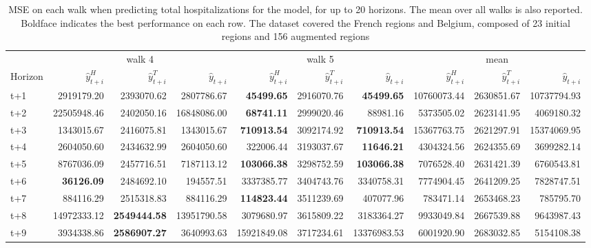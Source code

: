 \begin{table}[H]
\centering
\caption{MSE on each walk when predicting total hospitalizations for the model, for up to 20 horizons. The mean over all walks is also reported. Boldface indicates the best performance on each row. The dataset covered the French regions and Belgium, composed of 23 initial regions and 156 augmented regions }
\label{tab:MSE_walk_assemble}
\begin{tabular}{lrrrrrrrrr}
\toprule
 & \multicolumn{3}{c}{walk 4} & \multicolumn{3}{c}{walk 5} & \multicolumn{3}{c}{mean} 
\\

\cmidrule(lr){2-4} \cmidrule(lr){5-7} \cmidrule(lr){8-10} 
Horizon & $\hat{y}_{t+i}^H$ & $\hat{y}_{t+i}^T$ & $\hat{y}_{t+i}$ & $\hat{y}_{t+i}^H$ & $\hat{y}_{t+i}^T$ & $\hat{y}_{t+i}$ & $\hat{y}_{t+i}^H$ & $\hat{y}_{t+i}^T$ & $\hat{y}_{t+i}$ \\
\midrule
t+1  & 2919179.20  & 2393070.62  & 2807786.67  & \textbf{45499.65}  & 2916070.76  & \textbf{45499.65}  & 10760073.44  & 2630851.67  & 10737794.93  \\
t+2  & 22505948.46  & 2402050.16  & 16848086.00  & \textbf{68741.11}  & 2999020.46  & 88981.16  & 5373505.02  & 2623141.95  & 4069180.32  \\
t+3  & 1343015.67  & 2416075.81  & 1343015.67  & \textbf{710913.54}  & 3092174.92  & \textbf{710913.54}  & 15367763.75  & 2621297.91  & 15374069.95  \\
t+4  & 2604050.60  & 2434632.99  & 2604050.60  & 322006.44  & 3193037.67  & \textbf{11646.21}  & 4304324.56  & 2624355.69  & 3699282.14  \\
t+5  & 8767036.09  & 2457716.51  & 7187113.12  & \textbf{103066.38}  & 3298752.59  & \textbf{103066.38}  & 7076528.40  & 2631421.39  & 6760543.81  \\
t+6  & \textbf{36126.09}  & 2484692.10  & 194557.51  & 3337385.77  & 3404743.76  & 3340758.31  & 7774904.45  & 2641209.25  & 7828747.51  \\
t+7  & 884116.29  & 2515318.83  & 884116.29  & \textbf{114823.44}  & 3511239.69  & 407077.96  & 783471.14  & 2653468.23  & 785795.70  \\
t+8  & 14972333.12  & \textbf{2549444.58}  & 13951790.58  & 3079680.97  & 3615809.22  & 3183364.27  & 9933049.84  & 2667539.88  & 9643987.43  \\
t+9  & 3934338.86  & \textbf{2586907.27}  & 3640993.63  & 15921849.08  & 3717234.61  & 13376983.53  & 6001920.90  & 2683032.85  & 5154108.38  \\

\end{tabular}
\end{table}
